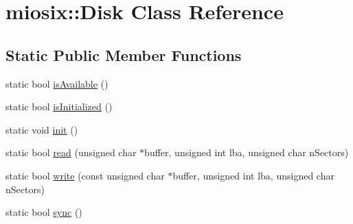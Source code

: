 \hypertarget{classmiosix_1_1_disk}{\section{miosix\-:\-:Disk Class Reference}
\label{classmiosix_1_1_disk}
}
\subsection*{Static Public Member Functions}
\begin{DoxyCompactItemize}
\item 
static bool \hyperlink{classmiosix_1_1_disk_a17d20dd748da7d0026c22177a4b7699b}{is\-Available} ()
\item 
static bool \hyperlink{classmiosix_1_1_disk_ac5d9bbd6f156e04fd713264c602f2f03}{is\-Initialized} ()
\item 
static void \hyperlink{classmiosix_1_1_disk_a6678632db08a30b9419c77fa6ff8673b}{init} ()
\item 
static bool \hyperlink{classmiosix_1_1_disk_a9c1dc9ba4dd052858ca6d2299faa48ea}{read} (unsigned char $\ast$buffer, unsigned int lba, unsigned char n\-Sectors)
\item 
static bool \hyperlink{classmiosix_1_1_disk_a148d46d5d74b85590a36c0eeb9d411f4}{write} (const unsigned char $\ast$buffer, unsigned int lba, unsigned char n\-Sectors)
\item 
static bool \hyperlink{classmiosix_1_1_disk_a59604600ebd0168cbc12417531bb0bed}{sync} ()
\end{DoxyCompactItemize}


